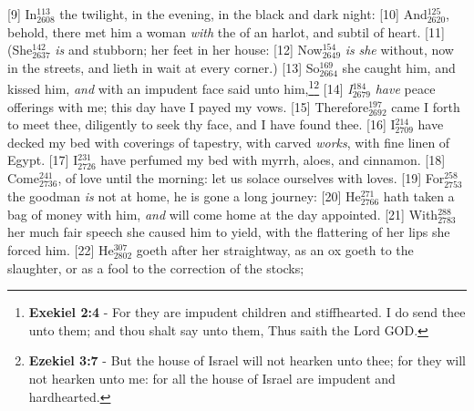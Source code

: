 [9] \textcolor[cmyk]{0.99998,1,0,0}{In\textcolor{jungle}{$_{2608}^{113}$} the twilight, in the evening, in the black and dark night:}
[10] \textcolor[cmyk]{0.99998,1,0,0}{And\textcolor{jungle}{$_{2620}^{125}$}, behold, there met him a woman \emph{with} the  of an harlot, and subtil of heart.}
[11] \textcolor[cmyk]{0.99998,1,0,0}{(She\textcolor{jungle}{$_{2637}^{142}$} \emph{is}  and stubborn; her feet  in her house:}
[12] \textcolor[cmyk]{0.99998,1,0,0}{Now\textcolor{jungle}{$_{2649}^{154}$} \emph{is} \emph{she} without, now in the streets, and lieth in wait at every corner.)}
[13] \textcolor[cmyk]{0.99998,1,0,0}{So\textcolor{jungle}{$_{2664}^{169}$} she caught him, and kissed him, \emph{and} with an impudent face said unto him,}\footnote{\textbf{Exekiel 2:4} - For they are impudent children and stiffhearted. I do send thee unto them; and thou shalt say unto them, Thus saith the Lord GOD.}\footnote{\textbf{Ezekiel 3:7} - But the house of Israel will not hearken unto thee; for they will not hearken unto me: for all the house of Israel are impudent and hardhearted.}
[14] \textcolor[cmyk]{0.99998,1,0,0}{\emph{I}\textcolor{jungle}{$_{2679}^{184}$} \emph{have} peace offerings with me; this day have I payed my vows.}
[15] \textcolor[cmyk]{0.99998,1,0,0}{Therefore\textcolor{jungle}{$_{2692}^{197}$} came I forth to meet thee, diligently to seek thy face, and I have found thee.}
[16] \textcolor[cmyk]{0.99998,1,0,0}{I\textcolor{jungle}{$_{2709}^{214}$} have decked my bed with coverings of tapestry, with carved \emph{works}, with fine linen of Egypt.}
[17] \textcolor[cmyk]{0.99998,1,0,0}{I\textcolor{jungle}{$_{2726}^{231}$} have perfumed my bed with myrrh, aloes, and cinnamon.}
[18] \textcolor[cmyk]{0.99998,1,0,0}{Come\textcolor{jungle}{$_{2736}^{241}$},  of love until the morning: let us solace ourselves with loves.}
[19] \textcolor[cmyk]{0.99998,1,0,0}{For\textcolor{jungle}{$_{2753}^{258}$} the goodman \emph{is} not at home, he is gone a long journey:}
[20] \textcolor[cmyk]{0.99998,1,0,0}{He\textcolor{jungle}{$_{2766}^{271}$} hath taken a bag of money with him, \emph{and} will come home at the day appointed.}
[21] \textcolor[cmyk]{0.99998,1,0,0}{With\textcolor{jungle}{$_{2783}^{288}$} her much fair speech she caused him to yield, with the flattering of her lips she forced him.}
[22] \textcolor[cmyk]{0.99998,1,0,0}{He\textcolor{jungle}{$_{2802}^{307}$} goeth after her straightway, as an ox goeth to the slaughter, or as a fool to the correction of the stocks;}
